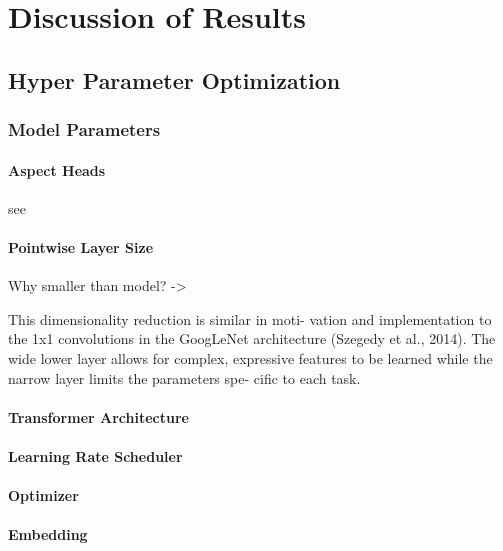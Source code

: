 \chapter{Discussion of Results}
\label{ch:discussion}

\section{Hyper Parameter Optimization}

\subsection{Model Parameters}

\subsubsection{Aspect Heads}

see \cite{Ramsundar2015}

\subsubsection{Pointwise Layer Size}

Why smaller than model? -> 

This dimensionality reduction is similar in moti- vation and implementation to the 1x1 convolutions in the GoogLeNet architecture (Szegedy et al., 2014). The wide lower layer allows for complex, expressive features to be learned while the narrow layer limits the parameters spe- cific to each task.

\cite{Ramsundar2015}

\subsubsection{Transformer Architecture}

\subsubsection{Learning Rate Scheduler}

\subsubsection{Optimizer}

\subsubsection{Embedding}


